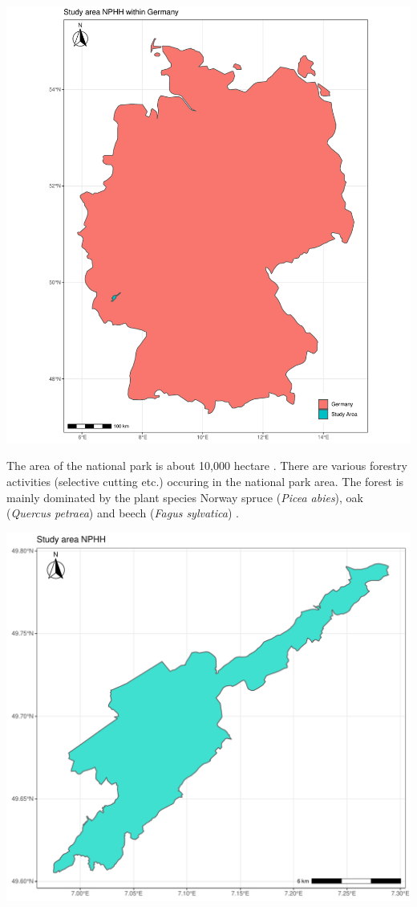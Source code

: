 \documentclass[a4paper, twoside]{templates/ociamthesis}
\let\origfigure\figure
\let\endorigfigure\endfigure
\renewenvironment{figure}[1][2] {
    \expandafter\origfigure\expandafter[H]
} {
    \endorigfigure
}
\begin{document}
\begin{figure}
\includegraphics[width=0.9\linewidth]{./figures/map_germany} \caption{The study area on Germany's map.}\label{fig:germanmap}
\end{figure}

The area of the national park is about 10,000 hectare \citep{fischer2016scientific}. There are various forestry activities (selective cutting etc.) occuring in the national park area. The forest is mainly dominated by the plant species Norway spruce (\emph{Picea abies}), oak (\emph{Quercus petraea}) and beech (\emph{Fagus sylvatica}) \citep{buddenbaum2015nationalpark}.

\begin{figure}
\includegraphics[width=0.9\linewidth]{./figures/map_np} \caption{The study area.}\label{fig:npmap}
\end{figure}
\end{document}
